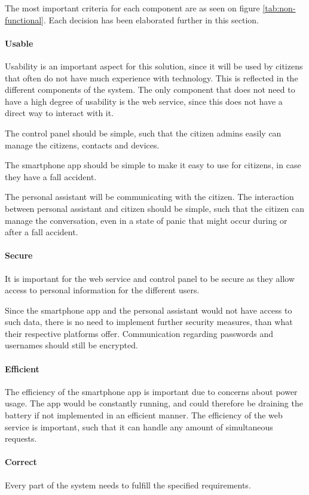 The most important criteria for each component are as seen on figure \ref{tab:non-functional}. Each decision has been elaborated further in this section.

\paragraph{Usable}
Usability is an important aspect for this solution, since it will be used by citizens that often do not have much experience with technology. This is reflected in the different components of the system. The only component that does not need to have a high degree of usability is the web service, since this does not have a direct way to interact with it.

The control panel should be simple, such that the citizen admins easily can manage the citizens, contacts and devices.

The smartphone app should be simple to make it easy to use for citizens, in case they have a fall accident.

The personal assistant will be communicating with the citizen. The interaction between personal assistant and citizen should be simple, such that the citizen can manage the conversation, even in a state of panic that might occur during or after a fall accident.

\paragraph{Secure}
It is important for the web service and control panel to be secure as they allow access to personal information for the different users.

Since the smartphone app and the personal assistant would not have access to such data, there is no need to implement further security measures, than what their respective platforms offer. Communication regarding passwords and usernames should still be encrypted.

\paragraph{Efficient}
The efficiency of the smartphone app is important due to concerns about power usage. The app would be constantly running, and could therefore be draining the battery if not implemented in an efficient manner. The efficiency of the web service is important, such that it can handle any amount of simultaneous requests.

\paragraph{Correct}
Every part of the system needs to fulfill the specified requirements.

